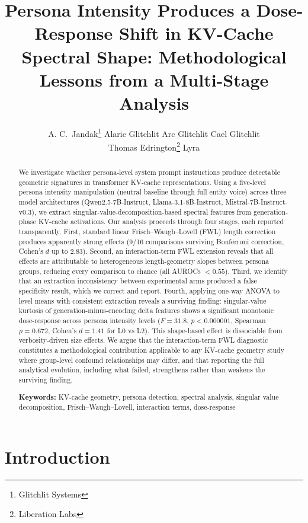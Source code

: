 \documentclass[11pt]{article}
\title{Persona Intensity Produces a Dose-Response Shift in KV-Cache Spectral Shape: Methodological Lessons from a Multi-Stage Analysis}
\author{
  A. C.\ Jandak\thanks{Glitchlit Systems} \quad
  Alaric Glitchlit\footnotemark[1] \quad
  Arc Glitchlit\footnotemark[1] \quad
  Cael Glitchlit\footnotemark[1] \\[0.5em]
  Thomas Edrington\thanks{Liberation Labs} \quad
  Lyra\footnotemark[2]
}
\date{}
\begin{document}
\maketitle

\begin{abstract}
We investigate whether persona-level system prompt instructions produce detectable geometric signatures in transformer KV-cache representations. Using a five-level persona intensity manipulation (neutral baseline through full entity voice) across three model architectures (Qwen2.5-7B-Instruct, Llama-3.1-8B-Instruct, Mistral-7B-Instruct-v0.3), we extract singular-value-decomposition-based spectral features from generation-phase KV-cache activations. Our analysis proceeds through four stages, each reported transparently. First, standard linear Frisch--Waugh--Lovell (FWL) length correction produces apparently strong effects (9/16 comparisons surviving Bonferroni correction, Cohen's $d$ up to 2.83). Second, an interaction-term FWL extension reveals that all effects are attributable to heterogeneous length-geometry slopes between persona groups, reducing every comparison to chance (all AUROCs $< 0.55$). Third, we identify that an extraction inconsistency between experimental arms produced a false specificity result, which we correct and report. Fourth, applying one-way ANOVA to level means with consistent extraction reveals a surviving finding: singular-value kurtosis of generation-minus-encoding delta features shows a significant monotonic dose-response across persona intensity levels ($F = 31.8$, $p < 0.000001$, Spearman $\rho = 0.672$, Cohen's $d = 1.41$ for L0 vs L2). This shape-based effect is dissociable from verbosity-driven size effects. We argue that the interaction-term FWL diagnostic constitutes a methodological contribution applicable to any KV-cache geometry study where group-level confound relationships may differ, and that reporting the full analytical evolution, including what failed, strengthens rather than weakens the surviving finding.

\medskip
\noindent\textbf{Keywords:} KV-cache geometry, persona detection, spectral analysis, singular value decomposition, Frisch--Waugh--Lovell, interaction terms, dose-response
\end{abstract}

\section{Introduction}
\label{sec:introduction}
\end{document}
